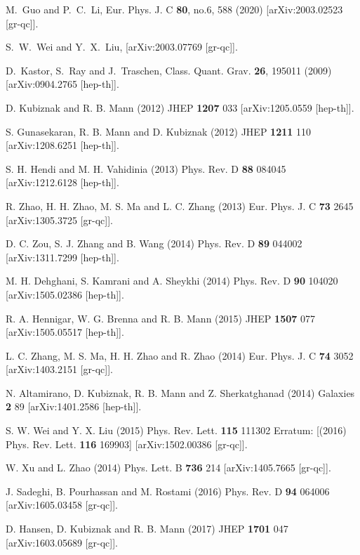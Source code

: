 \documentclass[aps,11pt]{revtex4}
\begin{document}
\begin{thebibliography}{99}
{
M.~Guo and P.~C.~Li,
Eur. Phys. J. C \textbf{80}, no.6, 588 (2020)
[arXiv:2003.02523 [gr-qc]].


S.~W.~Wei and Y.~X.~Liu,
[arXiv:2003.07769 [gr-qc]].


D.~Kastor, S.~Ray and J.~Traschen,
Class. Quant. Grav. \textbf{26}, 195011 (2009)
[arXiv:0904.2765 [hep-th]].

  D. Kubiznak and R. B. Mann (2012)
JHEP {\bf 1207} 033
[arXiv:1205.0559 [hep-th]].


  S. Gunasekaran, R. B. Mann and D. Kubiznak (2012)
JHEP \textbf{1211} 110  [arXiv:1208.6251 [hep-th]].


  S. H. Hendi and M. H. Vahidinia (2013)
Phys. Rev. D \textbf{88} 084045  [arXiv:1212.6128 [hep-th]].


  R. Zhao, H. H. Zhao, M. S. Ma and L. C. Zhang (2013)
Eur. Phys. J. C \textbf{73} 2645 [arXiv:1305.3725 [gr-qc]].


  D. C. Zou, S. J. Zhang and B. Wang (2014)
Phys. Rev. D \textbf{89} 044002 [arXiv:1311.7299 [hep-th]].


  M. H. Dehghani, S. Kamrani and A. Sheykhi (2014)
Phys. Rev. D \textbf{90} 104020
  [arXiv:1505.02386 [hep-th]].


  R. A. Hennigar, W. G. Brenna and R. B. Mann (2015)
JHEP \textbf{1507} 077
  [arXiv:1505.05517 [hep-th]].


  L. C. Zhang, M. S. Ma, H. H. Zhao and R. Zhao (2014)
Eur. Phys. J. C \textbf{74} 3052
  [arXiv:1403.2151 [gr-qc]].


  N. Altamirano, D. Kubiznak, R. B. Mann and Z. Sherkatghanad (2014)
Galaxies \textbf{2} 89
  [arXiv:1401.2586 [hep-th]].


  S. W. Wei and Y. X. Liu (2015)
Phys. Rev. Lett. \textbf{115} 111302
  Erratum: [(2016) Phys. Rev. Lett. \textbf{116} 169903]
  [arXiv:1502.00386 [gr-qc]].


  W. Xu and L. Zhao (2014)
Phys. Lett. B \textbf{736} 214
  [arXiv:1405.7665 [gr-qc]].


  J. Sadeghi, B. Pourhassan and M. Rostami (2016)
Phys. Rev. D \textbf{94} 064006
  [arXiv:1605.03458 [gr-qc]].


  D. Hansen, D. Kubiznak and R. B. Mann (2017)
JHEP \textbf{1701} 047
  [arXiv:1603.05689 [gr-qc]].


}
\end{thebibliography}
\end{document}
